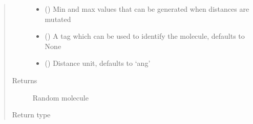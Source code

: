 \documentclass[letterpaper,10pt,english]{sphinxmanual}
\begin{document}
\begin{fulllineitems}
\begin{quote}
\begin{description}
\begin{itemize}
\item {} 
\sphinxAtStartPar
{} (\sphinxstyleliteralemphasis{\sphinxupquote{{[}}}\sphinxstyleliteralemphasis{\sphinxupquote{, }}\sphinxstyleliteralemphasis{\sphinxupquote{{]}}}) \textendash{} Min and max values that can be generated when distances are mutated

\item {} 
\sphinxAtStartPar
{} (\sphinxstyleliteralemphasis{\sphinxupquote{, }}) \textendash{} A tag which can be used to identify the molecule, defaults to None

\item {} 
\sphinxAtStartPar
{} (\sphinxstyleliteralemphasis{\sphinxupquote{, }}) \textendash{} Distance unit, defaults to ‘ang’

\end{itemize}

\item[{Returns}] \leavevmode
\sphinxAtStartPar
Random molecule

\item[{Return type}] \leavevmode
\sphinxAtStartPar
{\hyperref[\detokenize{molecular:molecular.Molecule}]{}}

\end{description}\end{quote}

\end{fulllineitems}

\end{document}
